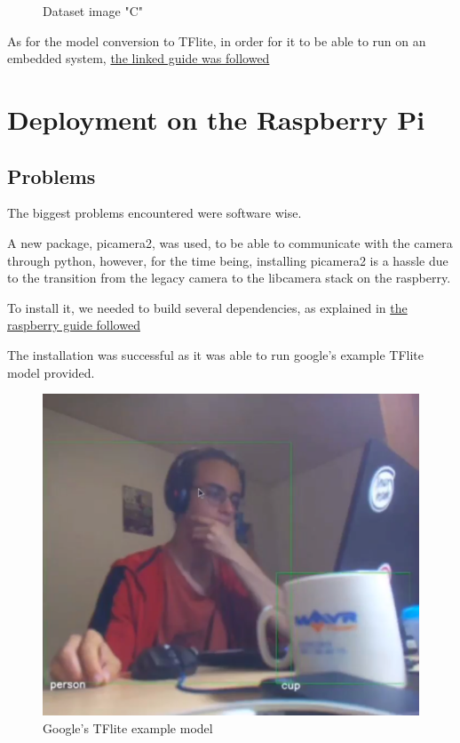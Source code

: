 \documentclass[10pt]{article}
\begin{document}
\begin{figure}[H]
\begin{minipage}[b]{0.45\textwidth}
				\caption{Dataset image "C"}
			\end{minipage}
		\end{figure}

	As for the model conversion to TFlite, in order for it to be able to run on an embedded system, \href{https://colab.research.google.com/github/tensorflow/models/blob/master/research/object_detection/colab_tutorials/convert_odt_model_to_TFLite.ipynb#scrollTo=-ecGLG_Ovjcr}{the linked guide was followed} \cite{8}

	\pagebreak

\section{Deployment on the Raspberry Pi}\label{sec:4}

	

	\subsection{Problems}

		The biggest problems encountered were software wise. 
		
		A new package, picamera2, was used, to be able to communicate with the camera through python, however, for the time being, installing picamera2 is a hassle due to the transition from the legacy camera to the libcamera stack on the raspberry.

		To install it, we needed to build several dependencies, as explained in \href{https://www.raspberrypi.com/news/using-the-picamera2-library-with-tensorflow-lite/}{the raspberry guide followed} \cite{9}

		The installation was successful as it was able to run google's example TFlite model provided.

		\begin{figure}[H]
			\centering
			\includegraphics[scale=1]{imgs/RaspberryGoogleModel.png}
			\caption{Google's TFlite example model}\label{fig:usage}
		\end{figure}
\end{document}
